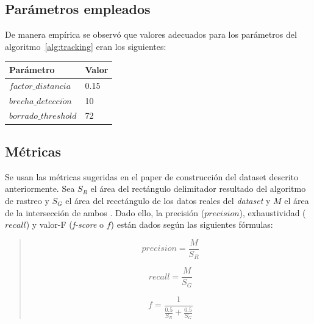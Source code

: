 \documentclass[a4paper,openright,12pt]{report}
\begin{document}
\subsection{Parámetros empleados}
De manera empírica se observó que valores adecuados para los parámetros del
algoritmo~\ref{alg:tracking} eran los siguientes:
  \begin{center}
    \begin{longtable}{| p{} | p{} |}
    \hline

    \textbf{Parámetro} &
    \textbf{Valor}
    \\ \hline

    \textbf{$factor\_distancia$} &
    0.15
    \\ \hline

    \textbf{$brecha\_detecci\acute on$} &
    10
    \\ \hline

    \textbf{$borrado\_threshold$} &
    72
    \\ \hline

    \end{longtable}
  \end{center}

\subsection{Métricas}
Se usan las métricas sugeridas en el paper de construcción del dataset descrito
anteriormente. Sea $S_{R}$ el área del rectángulo delimitador resultado del
algoritmo de rastreo y $S_{G}$ el área del recctángulo de los datos reales del
\textit{dataset} y $M$ el área de la intersección de ambos
\cite{do2014construction}. Dado ello, la
precisión ($precision$), exhaustividad ($recall$) y valor-F (\textit{f-score} o
$f$) están dados según las siguientes fórmulas:\\

  \begin{framed}
    \begin{quote}
      \[
          precision = \frac{M}{S_{R}}
      \]

      \[
          recall = \frac{M}{S_{G}}
      \]

      \[
          f = \frac{1}{\frac{0.5}{S_{R}} + \frac{0.5}{S_{G}}}
      \]
    \raggedleft\cite{do2014construction}
    \end{quote}
  \end{framed}
\end{document}
